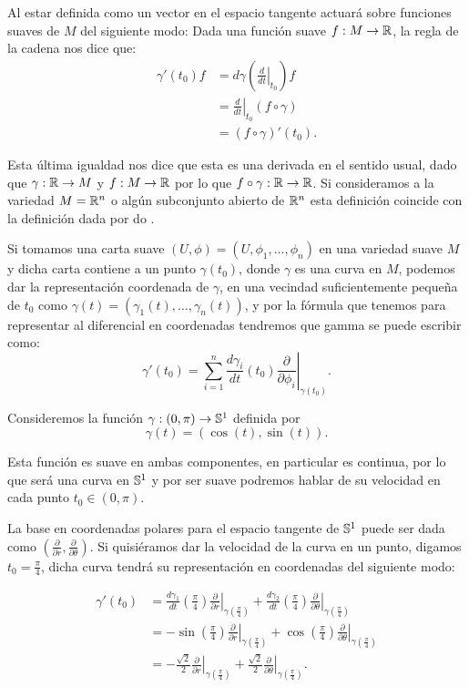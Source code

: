 Al estar definida como un vector en el espacio tangente actuará sobre funciones suaves de $M$ del siguiente modo: Dada una función suave $f: M \to \R$, la regla de la cadena nos dice que:
\begin{align*}
	\gamma'(t_0) f & =d\gamma\left(\left.\frac{d}{dt}\right|_{t_0} \right)f \\
	               & = \left. \frac{d}{dt} \right|_{t_0} (f \circ \gamma)   \\
	               & = (f \circ \gamma)' (t_0).
\end{align*}

Esta última igualdad nos dice que esta es una derivada en el sentido usual, dado que $\gamma: \R \to M$ y $f: M \to \R$ por lo que $f \circ \gamma: \R \to \R$. Si consideramos a la variedad $M=\R^n$ o algún subconjunto abierto de $\R^n$ esta definición coincide con la definición dada por do \textcite{do2016differential}.

Si tomamos una carta suave $(U,\phi) = (U,\phi_1,\dots,\phi_n)$ en una variedad suave $M$ y dicha carta contiene a un punto $\gamma(t_0)$, donde $\gamma$ es una curva en $M$, podemos dar la representación coordenada de $\gamma$, en una vecindad suficientemente pequeña de $t_0$ como $\gamma(t) = (\gamma_1(t), \dots, \gamma_n(t))$, y por la fórmula que tenemos para representar al diferencial en coordenadas tendremos que gamma se puede escribir como:
\[
	\gamma'(t_0)=\sum_{i=1}^{n}\frac{d \gamma_i}{dt} (t_0)
	\left. \frac{\partial}{\partial \phi_i} \right|_{\gamma(t_0)}.
\]

\begin{example}
	Consideremos la función $\gamma: (0,\pi) \to \S^{1}$ definida por
	\[
		\gamma(t) = (\cos (t), \sin (t)).
	\]

	Esta función es suave en ambas componentes, en particular es continua, por lo que será una curva en $\S^1$ y por ser suave podremos hablar de su velocidad en cada punto $t_0 \in (0,\pi)$.

	La base en coordenadas polares para el espacio tangente de $\S^{1}$ puede ser dada como $\left( \frac{\partial}{\partial r} , \frac{\partial}{\partial \theta} \right)$. Si quisiéramos dar la velocidad de la curva en un punto, digamos $t_0 = \frac{\pi}{4}$, dicha curva tendrá su representación en coordenadas del siguiente modo:

	\begin{align*}
		\gamma'(t_0) & = \frac{d \gamma_1}{dt}\left( \frac{\pi}{4} \right)
		\left.\frac{\partial}{\partial r} \right|_{\gamma(\frac{\pi}{4})} +
		\frac{d \gamma_2}{dt} \left(\frac{\pi}{4} \right)
		\left.\frac{\partial}{\partial\theta} \right|_{\gamma(\frac{\pi}{4})} \\
		             & = -\sin \left(\frac{\pi}{4}\right)
		\left. \frac{\partial}{\partial r} \right|_{\gamma(\frac{\pi}{4})} +
		\cos \left( \frac{\pi}{4} \right)
		\left.\frac{\partial}{\partial\theta}\right|_{\gamma(\frac{\pi}{4})}  \\
		             & = -\frac{\sqrt{2}}{2}
		\left. \frac{\partial}{\partial r} \right|_{\gamma(\frac{\pi}{4})}
		+ \frac{\sqrt{2}}{2}
		\left. \frac{\partial}{\partial\theta} \right|_{\gamma(\frac{\pi}{4})}.
	\end{align*}
\end{example}

